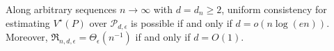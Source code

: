 Along arbitrary sequences \(n\to\infty\) with \(d=d_n\geq2\), uniform consistency for estimating \(V^\star(P)\) over \(\mathcal P_{d,\epsilon}\) is possible if and only if \(d=o(n\log(en))\). Moreover, \(\mathfrak R_{n,d,\epsilon}=\Theta_\epsilon(n^{-1})\) if and only if \(d=O(1)\).